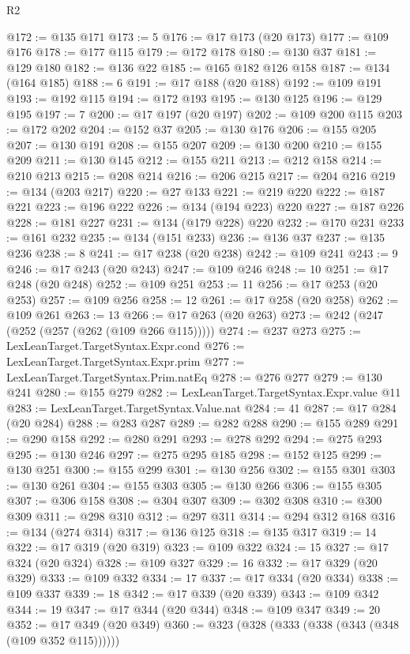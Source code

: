 \begin{lexlean}{R2}
\begin{coremodule}
@172 := @135 @171
@173 := 5
@176 := @17 @173 (@20 @173)
@177 := @109 @176
@178 := @177 @115
@179 := @172 @178
@180 := @130 @37
@181 := @129 @180
@182 := @136 @22
@185 := @165 @182 @126 @158
@187 := @134 (@164 @185)
@188 := 6
@191 := @17 @188 (@20 @188)
@192 := @109 @191
@193 := @192 @115
@194 := @172 @193
@195 := @130 @125
@196 := @129 @195
@197 := 7
@200 := @17 @197 (@20 @197)
@202 := @109 @200 @115
@203 := @172 @202
@204 := @152 @37
@205 := @130 @176
@206 := @155 @205
@207 := @130 @191
@208 := @155 @207
@209 := @130 @200
@210 := @155 @209
@211 := @130 @145
@212 := @155 @211
@213 := @212 @158
@214 := @210 @213
@215 := @208 @214
@216 := @206 @215
@217 := @204 @216
@219 := @134 (@203 @217)
@220 := @27 @133
@221 := @219 @220
@222 := @187 @221
@223 := @196 @222
@226 := @134 (@194 @223) @220
@227 := @187 @226
@228 := @181 @227
@231 := @134 (@179 @228) @220
@232 := @170 @231
@233 := @161 @232
@235 := @134 (@151 @233)
@236 := @136 @37
@237 := @135 @236
@238 := 8
@241 := @17 @238 (@20 @238)
@242 := @109 @241
@243 := 9
@246 := @17 @243 (@20 @243)
@247 := @109 @246
@248 := 10
@251 := @17 @248 (@20 @248)
@252 := @109 @251
@253 := 11
@256 := @17 @253 (@20 @253)
@257 := @109 @256
@258 := 12
@261 := @17 @258 (@20 @258)
@262 := @109 @261
@263 := 13
@266 := @17 @263 (@20 @263)
@273 := @242 (@247 (@252 (@257 (@262 (@109 @266 @115)))))
@274 := @237 @273
@275 := LexLeanTarget.TargetSyntax.Expr.cond
@276 := LexLeanTarget.TargetSyntax.Expr.prim
@277 := LexLeanTarget.TargetSyntax.Prim.natEq
@278 := @276 @277
@279 := @130 @241
@280 := @155 @279
@282 := LexLeanTarget.TargetSyntax.Expr.value @11
@283 := LexLeanTarget.TargetSyntax.Value.nat
@284 := 41
@287 := @17 @284 (@20 @284)
@288 := @283 @287
@289 := @282 @288
@290 := @155 @289
@291 := @290 @158
@292 := @280 @291
@293 := @278 @292
@294 := @275 @293
@295 := @130 @246
@297 := @275 @295 @185
@298 := @152 @125
@299 := @130 @251
@300 := @155 @299
@301 := @130 @256
@302 := @155 @301
@303 := @130 @261
@304 := @155 @303
@305 := @130 @266
@306 := @155 @305
@307 := @306 @158
@308 := @304 @307
@309 := @302 @308
@310 := @300 @309
@311 := @298 @310
@312 := @297 @311
@314 := @294 @312 @168
@316 := @134 (@274 @314)
@317 := @136 @125
@318 := @135 @317
@319 := 14
@322 := @17 @319 (@20 @319)
@323 := @109 @322
@324 := 15
@327 := @17 @324 (@20 @324)
@328 := @109 @327
@329 := 16
@332 := @17 @329 (@20 @329)
@333 := @109 @332
@334 := 17
@337 := @17 @334 (@20 @334)
@338 := @109 @337
@339 := 18
@342 := @17 @339 (@20 @339)
@343 := @109 @342
@344 := 19
@347 := @17 @344 (@20 @344)
@348 := @109 @347
@349 := 20
@352 := @17 @349 (@20 @349)
@360 := @323 (@328 (@333 (@338 (@343 (@348 (@109 @352 @115))))))

\end{coremodule}
\end{lexlean}
